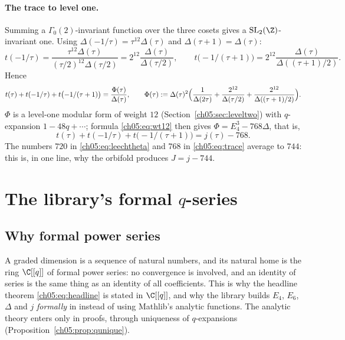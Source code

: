 \paragraph{The trace to level one.}
Summing a $\Gamma_0(2)$-invariant function over the three cosets gives a $\chfiveSL$-invariant one.
Using $\Delta(-1/\tau) = \tau^{12}\Delta(\tau)$ and $\Delta(\tau+1) = \Delta(\tau)$:
\begin{equation*}
  t(-1/\tau) = \frac{\tau^{12}\Delta(\tau)}{(\tau/2)^{12}\Delta(\tau/2)} = 2^{12}\frac{\Delta(\tau)}{\Delta(\tau/2)},\qquad
  t\bigl(-1/(\tau+1)\bigr) = 2^{12}\frac{\Delta(\tau)}{\Delta((\tau+1)/2)}.
\end{equation*}
Hence
\begin{equation}\label{ch05:eq:phi}
  t(\tau) + t(-1/\tau) + t\bigl(-1/(\tau+1)\bigr) = \frac{\Phi(\tau)}{\Delta(\tau)},\qquad
  \Phi(\tau) := \Delta(\tau)^2\Bigl(\frac{1}{\Delta(2\tau)} + \frac{2^{12}}{\Delta(\tau/2)} +
  \frac{2^{12}}{\Delta((\tau+1)/2)}\Bigr).
\end{equation}
$\Phi$ is a level-one modular form of weight $12$ (Section~\ref{ch05:sec:leveltwo}) with
$q$-expansion $1 - 48q + \cdots$; formula \eqref{ch05:eq:wt12} then gives $\Phi = E_4^3 - 768\Delta$,
that is,
\begin{equation}\label{ch05:eq:trace}
  t(\tau) + t(-1/\tau) + t\bigl(-1/(\tau+1)\bigr) = j(\tau) - 768 .
\end{equation}
The numbers $720$ in \eqref{ch05:eq:leechtheta} and $768$ in \eqref{ch05:eq:trace} average to $744$:
this is, in one line, why the orbifold produces $J = j - 744$.

\section{The library's formal \texorpdfstring{$q$}{q}-series}\label{ch05:sec:formal}

\subsection{Why formal power series}

A graded dimension is a sequence of natural numbers, and its natural home is the ring $\C[[q]]$ of
formal power series: no convergence is involved, and an identity of series is the same thing as an
identity of all coefficients. This is why the headline theorem \eqref{ch05:eq:headline} is stated
in $\C[[q]]$, and why the library builds $E_4$, $E_6$, $\Delta$ and $j$ \emph{formally} in
 instead of using Mathlib's analytic functions. The
analytic theory enters only in proofs, through uniqueness of $q$-expansions
(Proposition~\ref{ch05:prop:qunique}).

